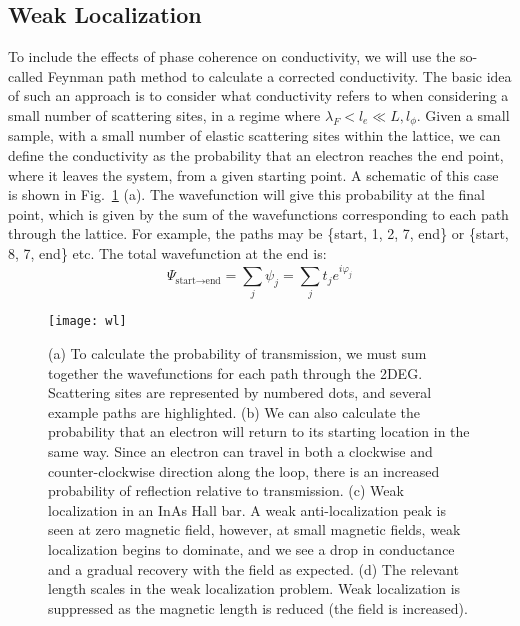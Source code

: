 \subsection{Weak Localization}
\label{sec:wl}
To include the effects of phase coherence on conductivity, we will use the so-called Feynman path method to calculate
a corrected conductivity. The basic idea of such an approach is to consider what conductivity refers to when considering
a small number of scattering sites, in a regime where $\lambda_F < l_e \ll L, l_\phi$. Given a small sample, with a small
number of elastic scattering sites within the lattice, we can define the conductivity as the probability that an electron
reaches the end point, where it leaves the system, from a given starting point. A schematic of this case is shown in Fig.~\ref{fig:WL} (a).
The wavefunction will give this probability at the final point, which is given by the sum of the wavefunctions corresponding
to each path through the lattice. For example, the paths may be \{start, 1, 2, 7, end\} or \{start, 8, 7, end\} etc.
The total wavefunction at the end is:
\begin{equation}
  \Psi_{\textrm{start}\rightarrow\textrm{end}} = \sum_j \psi_j = \sum_j t_j e^{i \varphi_j}
\end{equation}

\begin{figure}
  \texttt{[image: wl]}
  \caption[Weak localization]
  {\label{fig:WL}(a) To calculate the probability of transmission, we must sum together the wavefunctions for each path through the 2DEG. Scattering sites are represented by numbered dots, and several example paths are highlighted.
  (b) We can also calculate the probability that an electron will return to its starting location in the same way. Since an electron can travel in both a clockwise and counter-clockwise direction along the loop, there is an increased probability of reflection relative to transmission.
  (c) Weak localization in an InAs Hall bar. A weak anti-localization peak is seen at zero magnetic field, however, at small magnetic fields, weak localization begins to dominate, and we see a drop in conductance and a gradual recovery with the field as expected. (d) The relevant length scales in the weak localization problem. Weak localization is suppressed as the magnetic length is reduced (the field is increased).}
\end{figure}

